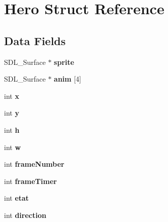 \hypertarget{structHero}{}\section{Hero Struct Reference}
\label{structHero}
\subsection*{Data Fields}
\begin{DoxyCompactItemize}
\item 
\mbox{\label{structHero_ad857894baa28c986b4d8e5de10eb6473}} 
S\+D\+L\+\_\+\+Surface $\ast$ {\bfseries sprite}
\item 
\mbox{\label{structHero_a795569ebc9397747631a50accf7a26cd}} 
S\+D\+L\+\_\+\+Surface $\ast$ {\bfseries anim} \mbox{[}4\mbox{]}
\item 
\mbox{\label{structHero_a51935f2833c54a990f04eca42c6fae8b}} 
int {\bfseries x}
\item 
\mbox{\label{structHero_abb59184fcb4fc16c9e8a4762e764a33b}} 
int {\bfseries y}
\item 
\mbox{\label{structHero_aeb4bffdb661fc37712d2052fe16dde72}} 
int {\bfseries h}
\item 
\mbox{\label{structHero_ab4c9493008decd1a42cf6ec899c252af}} 
int {\bfseries w}
\item 
\mbox{\label{structHero_ab752c1015845146622950630a806bd74}} 
int {\bfseries frame\+Number}
\item 
\mbox{\label{structHero_a23f2f105536856c827dca4954c8eb968}} 
int {\bfseries frame\+Timer}
\item 
\mbox{\label{structHero_a1ebca0786859803838d3057023052260}} 
int {\bfseries etat}
\item 
\mbox{\label{structHero_ab8693a2ae0acdd7dcd0cc82b70319d48}} 
int {\bfseries direction}
\item 
\mbox{\label{structHero_aefaac1b686649c99d0d1b4121c46d025}} 

\end{DoxyCompactItemize}
